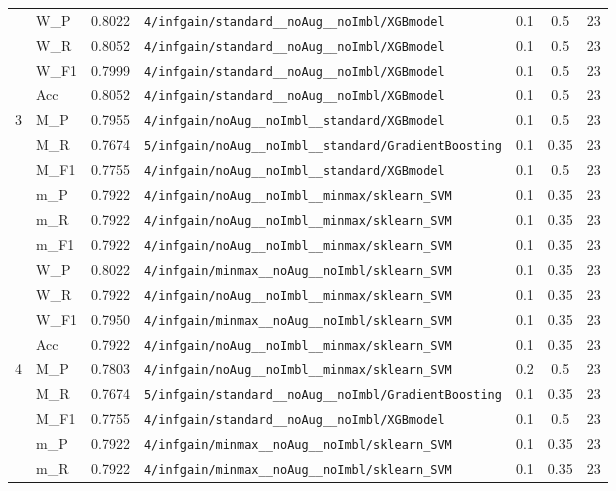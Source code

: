\begin{table}[htbp]
\begin{tabular}{|c|l|c|>{\ttfamily\footnotesize}p{7.2cm}|c|c|c|}
 & W\_P & 0.8022 & \texttt{4/infgain/standard\_\_noAug\_\_noImbl/XGBmodel} & 0.1 & 0.5  & 23 \\ 
 & W\_R & 0.8052 & \texttt{4/infgain/standard\_\_noAug\_\_noImbl/XGBmodel} & 0.1 & 0.5  & 23 \\ 
 & W\_F1 & 0.7999 & \texttt{4/infgain/standard\_\_noAug\_\_noImbl/XGBmodel} & 0.1 & 0.5  & 23 \\ 
 & Acc & 0.8052 & \texttt{4/infgain/standard\_\_noAug\_\_noImbl/XGBmodel} & 0.1 & 0.5  & 23 \\ 
\hline
\multirow{10}{*}{3} & M\_P & 0.7955 & \texttt{4/infgain/noAug\_\_noImbl\_\_standard/XGBmodel} & 0.1 & 0.5  & 23 \\ 
 & M\_R & 0.7674 & \texttt{5/infgain/noAug\_\_noImbl\_\_standard/GradientBoosting} & 0.1 & 0.35  & 23 \\ 
 & M\_F1 & 0.7755 & \texttt{4/infgain/noAug\_\_noImbl\_\_standard/XGBmodel} & 0.1 & 0.5  & 23 \\ 
 & m\_P & 0.7922 & \texttt{4/infgain/noAug\_\_noImbl\_\_minmax/sklearn\_SVM} & 0.1 & 0.35  & 23 \\ 
 & m\_R & 0.7922 & \texttt{4/infgain/noAug\_\_noImbl\_\_minmax/sklearn\_SVM} & 0.1 & 0.35  & 23 \\ 
 & m\_F1 & 0.7922 & \texttt{4/infgain/noAug\_\_noImbl\_\_minmax/sklearn\_SVM} & 0.1 & 0.35  & 23 \\ 
 & W\_P & 0.8022 & \texttt{4/infgain/minmax\_\_noAug\_\_noImbl/sklearn\_SVM} & 0.1 & 0.35  & 23 \\ 
 & W\_R & 0.7922 & \texttt{4/infgain/noAug\_\_noImbl\_\_minmax/sklearn\_SVM} & 0.1 & 0.35  & 23 \\ 
 & W\_F1 & 0.7950 & \texttt{4/infgain/minmax\_\_noAug\_\_noImbl/sklearn\_SVM} & 0.1 & 0.35  & 23 \\ 
 & Acc & 0.7922 & \texttt{4/infgain/noAug\_\_noImbl\_\_minmax/sklearn\_SVM} & 0.1 & 0.35  & 23 \\ 
\hline
\multirow{10}{*}{4} & M\_P & 0.7803 & \texttt{4/infgain/noAug\_\_noImbl\_\_minmax/sklearn\_SVM} & 0.2 & 0.5  & 23 \\ 
 & M\_R & 0.7674 & \texttt{5/infgain/standard\_\_noAug\_\_noImbl/GradientBoosting} & 0.1 & 0.35  & 23 \\ 
 & M\_F1 & 0.7755 & \texttt{4/infgain/standard\_\_noAug\_\_noImbl/XGBmodel} & 0.1 & 0.5  & 23 \\ 
 & m\_P & 0.7922 & \texttt{4/infgain/minmax\_\_noAug\_\_noImbl/sklearn\_SVM} & 0.1 & 0.35  & 23 \\ 
 & m\_R & 0.7922 & \texttt{4/infgain/minmax\_\_noAug\_\_noImbl/sklearn\_SVM} & 0.1 & 0.35  & 23 \\ 

\end{tabular}
\end{table}
